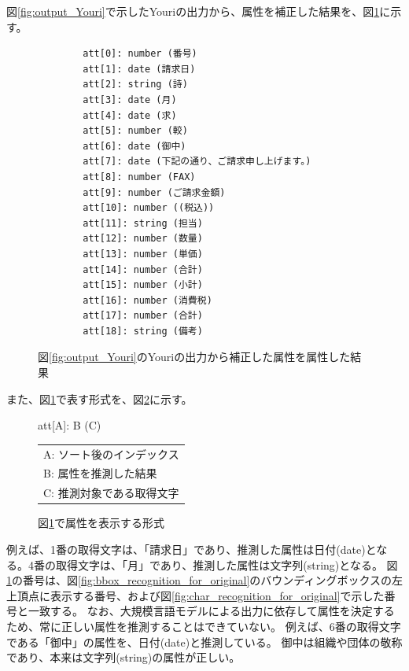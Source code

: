 図\ref{fig:output_Youri}で示したYouriの出力から、属性を補正した結果を、図\ref{fig:predict_att_for_original}に示す。
\lstset{language=}
\begin{figure}[tp]
    \begin{lstlisting}
        att[0]: number (番号)
        att[1]: date (請求日)
        att[2]: string (詩)
        att[3]: date (月)
        att[4]: date (求)
        att[5]: number (較)
        att[6]: date (御中)
        att[7]: date (下記の通り、ご請求申し上げます。)
        att[8]: number (FAX)
        att[9]: number (ご請求金額)
        att[10]: number ((税込))
        att[11]: string (担当)
        att[12]: number (数量)
        att[13]: number (単価)
        att[14]: number (合計)
        att[15]: number (小計)
        att[16]: number (消費税)
        att[17]: number (合計)
        att[18]: string (備考)
    \end{lstlisting}
    \caption{図\ref{fig:output_Youri}のYouriの出力から補正した属性を属性した結果}
    \label{fig:predict_att_for_original}
\end{figure}
また、図\ref{fig:predict_att_for_original}で表す形式を、図\ref{fig:format_att}に示す。
\begin{figure}[tp]
    \begin{center}
        att[A]: B (C)
    \end{center}

    \begin{center}
        \begin{tabular}{l}
            A: ソート後のインデックス\\
            B: 属性を推測した結果\\
            C: 推測対象である取得文字\\
        \end{tabular}
    \end{center}
    \caption{図\ref{fig:predict_att_for_original}で属性を表示する形式}
    \label{fig:format_att}
\end{figure}
例えば、1番の取得文字は、「請求日」であり、推測した属性は日付(date)となる。4番の取得文字は、「月」であり、推測した属性は文字列(string)となる。
図\ref{fig:predict_att_for_original}の番号は、図\ref{fig:bbox_recognition_for_original}のバウンディングボックスの左上頂点に表示する番号、および図\ref{fig:char_recognition_for_original}で示した番号と一致する。
なお、大規模言語モデルによる出力に依存して属性を決定するため、常に正しい属性を推測することはできていない。
例えば、6番の取得文字である「御中」の属性を、日付(date)と推測している。
御中は組織や団体の敬称であり、本来は文字列(string)の属性が正しい。


